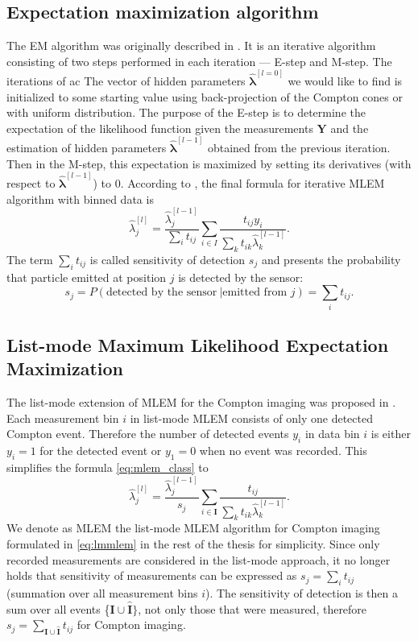 \subsection{Expectation maximization algorithm}
The \ac{EM} algorithm was originally described in \cite{EM}. 
It is an iterative algorithm consisting of two steps performed in each iteration --- E-step and M-step.
The iterations of ac	
The vector of hidden parameters  $\mathbf{\hat{\lambda}}^{[l = 0]}$ we would like to find is initialized to some starting value using back-projection of the Compton cones or with uniform distribution.
The purpose of the E-step is to determine the expectation of the likelihood function given the measurements $\mathbf{Y}$ and the estimation of hidden parameters $\mathbf{\hat{\lambda}}^{[l-1]}$ obtained from the previous iteration. 
Then in the M-step, this expectation is maximized by setting its derivatives (with respect to $\mathbf{\hat{\lambda}}^{[l-1]}$) to $0$.
According to \cite{MLEM_Lange_Carlson_1984}, the final formula for iterative \ac{MLEM} algorithm with binned data is 
\begin{equation}
  \hat{\lambda}_{j}^{[l]} = \frac{\hat{\lambda}_{j}^{[l-1]}}{\sum_{i}t_{ij}} \sum_{i \in I} \frac{t_{ij} y_{i}}{\sum_{k} t_{ik} \hat{\lambda}_{k}^{[l-1]}}.
  \label{eq:mlem_class}
\end{equation}
The term $\sum_{i}t_{ij}$ is called sensitivity of detection $s_{j}$ and presents the probability that particle emitted at position $j$ is detected by the sensor:
\begin{equation}
  s_{j} = P(\textrm{detected by the sensor}\ | \textrm{emitted from } j) =  \sum_{i}t_{ij}.
\end{equation}
\subsection{List-mode Maximum Likelihood Expectation Maximization}
The list-mode extension of \ac{MLEM} for the Compton imaging was proposed in \cite{wilderman}.
Each measurement bin $i$ in list-mode \ac{MLEM} consists of only one detected Compton event.
Therefore the number of detected events $y_{i}$ in data bin $i$ is either $y_{i} = 1$ for the detected event or $y_{1} = 0$ when no event was recorded.
This simplifies the formula \ref{eq:mlem_class} to
\begin{equation}
  \hat{\lambda}_{j}^{[l]} = \frac{\hat{\lambda}_{j}^{[l-1]}}{s_{j}} \sum_{i \in \mathbf{I}}\frac{t_{ij} }{\sum_{k} t_{ik} \hat{\lambda}_{k}^{[l-1]}}.
  \label{eq:lmmlem}
\end{equation}
We denote as \ac{MLEM} the list-mode \ac{MLEM} algorithm for Compton imaging formulated in \ref{eq:lmmlem} in the rest of the thesis for simplicity.
Since only recorded measurements are considered in the list-mode approach, it no longer holds that sensitivity of measurements can be expressed as $s_{j} = \sum_{i}t_{ij}$ (summation over all measurement bins $i$).
The sensitivity of detection is then a sum over all events \{$\mathbf{I} \cup \mathbf{\hat{I}}\}$, not only those that were measured, therefore $s_{j} = \sum_{\mathbf{I} \cup \mathbf{\hat{I}}} t_{ij}$ for Compton imaging.
